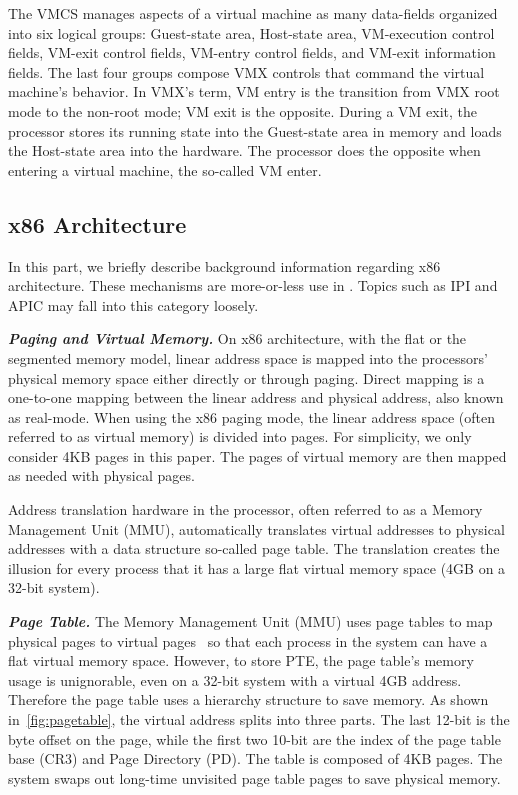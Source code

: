 The VMCS manages aspects of a virtual machine as many data-fields organized into six logical groups: Guest-state area, Host-state area, VM-execution control fields, VM-exit control fields, VM-entry control fields, and VM-exit information fields. The last four groups compose VMX controls that command the virtual machine's behavior. In VMX's term, VM entry is the transition from VMX root mode to the non-root mode; VM exit is the opposite. During a VM exit, the processor stores its running state into the Guest-state area in memory and loads the Host-state area into the hardware. The processor does the opposite when entering a virtual machine, the so-called VM enter.


\subsection{x86 Architecture}

In this part, we briefly describe background information regarding x86 architecture. These mechanisms are more-or-less use in \name. Topics such as IPI and APIC may fall into this category loosely.

\textbf{\textit{Paging and Virtual Memory.}} On x86 architecture, with the flat or the segmented memory model, linear address space is mapped into the processors' physical memory space either directly or through paging.  Direct mapping is a one-to-one mapping between the linear address and physical address, also known as real-mode. When using the x86 paging mode, the linear address space (often referred to as virtual memory) is divided into pages. For simplicity, we only consider 4KB pages in this paper. The pages of virtual memory are then mapped as needed with physical pages.

Address translation hardware in the processor, often referred to as a Memory Management Unit (MMU), automatically translates virtual addresses to physical addresses with a data structure so-called page table. The translation creates the illusion for every process that it has a large flat virtual memory space (4GB on a 32-bit system).



\textbf{\textit{Page Table.}} The Memory Management Unit (MMU) uses page tables to map physical pages to virtual pages~\cite{intelpaging} so that each process in the system can have a flat virtual memory space. However, to store PTE, the page table's memory usage is unignorable, even on a 32-bit system with a virtual 4GB address. Therefore the page table uses a hierarchy structure to save memory. As shown in~\autoref{fig:pagetable}, the virtual address splits into three parts. The last 12-bit is the byte offset on the page, while the first two 10-bit are the index of the page table base (CR3) and Page Directory (PD). The table is composed of 4KB pages.  The system swaps out long-time unvisited page table pages to save physical memory. 

